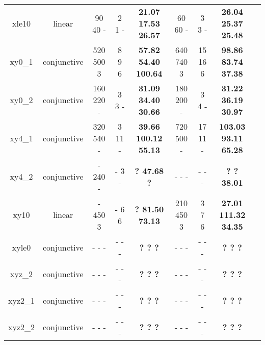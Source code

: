 \begin{table}[t]
\begin{tabular}{l c | c c c | c c c | c }
\multicolumn{1}{|c|}{xle10}				&linear 			&90 40 - &2 1 -&\textbf{21.07 17.53 26.57}	&60 60 - &3 3 -  &\textbf{26.04 25.37 25.48}		&\multicolumn{1}{|c|}{\cmark} \\
\multicolumn{1}{|c|}{xy0\_1}			&conjunctive		&520 500 3 &8 9 6 &\textbf{57.82 54.40 100.64}	&640 740 3 &15 16 6   &\textbf{98.86 83.74 37.38}		&\multicolumn{1}{|c|}{\cmark} \\
\multicolumn{1}{|c|}{xy0\_2}			&conjunctive		&160 220 - &3 3 -&\textbf{31.09 34.40 30.66}	&180 200 - &3 4 -  &\textbf{31.22 36.19 30.97}		&\multicolumn{1}{|c|}{\cmark} \\
\multicolumn{1}{|c|}{xy4\_1}			&conjunctive		&320 540 - &3 11 -&\textbf{39.66 100.12 55.13}	&720 500 - &17 11 -  &\textbf{103.03 93.11 65.28}	&\multicolumn{1}{|c|}{\cmark} \\
\multicolumn{1}{|c|}{xy4\_2}			&conjunctive		&- 240 - &- 3 -&\textbf{? 47.68 ?}			&- - - &- - -  &\textbf{? ? 38.01}				&\multicolumn{1}{|c|}{\cmark} \\
\multicolumn{1}{|c|}{xy10}				&linear 			&- 450 3 &- 6 6 &\textbf{? 81.50 73.13}		&210 450 3 &3 7 6   &\textbf{27.01 111.32 34.35}	&\multicolumn{1}{|c|}{\cmark} \\
\multicolumn{1}{|c|}{xyle0}				&conjunctive		&- - - &- - -&\textbf{? ? ?}				&- - - &- - -  &\textbf{? ? ?}					&\multicolumn{1}{|c|}{\cmark} \\
\multicolumn{1}{|c|}{xyz\_2}			&conjunctive		&- - - &- - -&\textbf{? ? ?}				&- - - &- - -  &\textbf{? ? ?}					&\multicolumn{1}{|c|}{\cmark} \\
\multicolumn{1}{|c|}{xyz2\_1}			&conjunctive		&- - - &- - -&\textbf{? ? ?}				&- - - &- - -  &\textbf{? ? ?}					&\multicolumn{1}{|c|}{\cmark} \\
\multicolumn{1}{|c|}{xyz2\_2}			&conjunctive		&- - - &- - -&\textbf{? ? ?}				&- - - &- - -  &\textbf{? ? ?}					&\multicolumn{1}{|c|}{\cmark} \\
	

\end{tabular}
\end{table}
